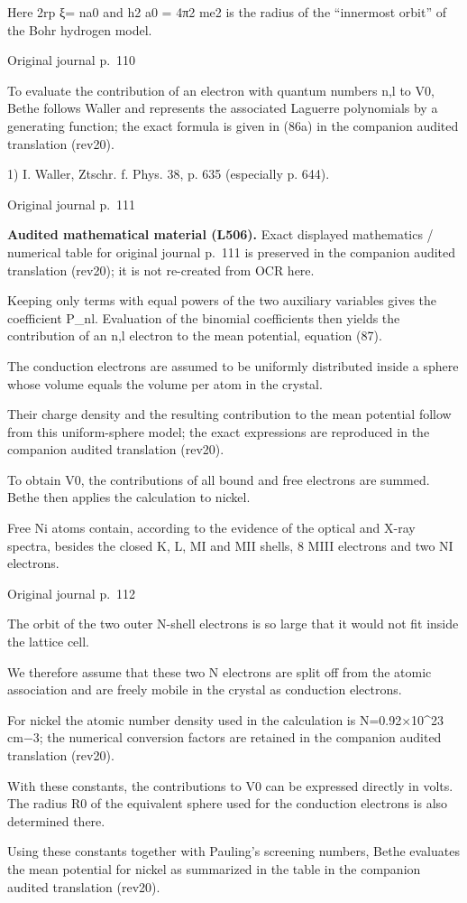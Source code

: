 \documentclass[10pt]{article}
\newcommand{\origpage}[1]{\par\medskip\noindent\hfill{\small\color{notegray}Original journal p.~#1}\hfill\mbox{}\par\smallskip}
\newcommand{\mathref}[2]{\par\smallskip\noindent\colorbox{gray!8}{\parbox{0.95\linewidth}{\small\color{notegray}\textbf{Audited mathematical material (L#1).} Exact displayed mathematics / numerical table for original journal p.~#2 is preserved in the companion audited translation (rev20); it is not re-created from OCR here.}}\par\smallskip}
\begin{document}
Here 2rp ξ= na0 and h2 a0 = 4π2 me2 is the radius of the “innermost orbit” of the Bohr hydrogen model.\par
\origpage{110}
To evaluate the contribution of an electron with quantum numbers n,l to V0, Bethe follows Waller and represents the associated Laguerre polynomials by a generating function; the exact formula is given in (86a) in the companion audited translation (rev20).\par
\noindent\footnotesize 1) I. Waller, Ztschr. f. Phys. 38, p. 635 (especially p. 644).\par\normalsize
\origpage{111}
\mathref{506}{111}
Keeping only terms with equal powers of the two auxiliary variables gives the coefficient P\_nl. Evaluation of the binomial coefficients then yields the contribution of an n,l electron to the mean potential, equation (87).\par
The conduction electrons are assumed to be uniformly distributed inside a sphere whose volume equals the volume per atom in the crystal.\par
Their charge density and the resulting contribution to the mean potential follow from this uniform-sphere model; the exact expressions are reproduced in the companion audited translation (rev20).\par
To obtain V0, the contributions of all bound and free electrons are summed. Bethe then applies the calculation to nickel.\par
Free Ni atoms contain, according to the evidence of the optical and X-ray spectra, besides the closed K, L, MI and MII shells, 8 MIII electrons and two NI electrons.\par
\origpage{112}
The orbit of the two outer N-shell electrons is so large that it would not fit inside the lattice cell.\par
We therefore assume that these two N electrons are split off from the atomic association and are freely mobile in the crystal as conduction electrons.\par
For nickel the atomic number density used in the calculation is N=0.92×10\textasciicircum{}23 cm−3; the numerical conversion factors are retained in the companion audited translation (rev20).\par
With these constants, the contributions to V0 can be expressed directly in volts. The radius R0 of the equivalent sphere used for the conduction electrons is also determined there.\par
Using these constants together with Pauling’s screening numbers, Bethe evaluates the mean potential for nickel as summarized in the table in the companion audited translation (rev20).\par
\end{document}
